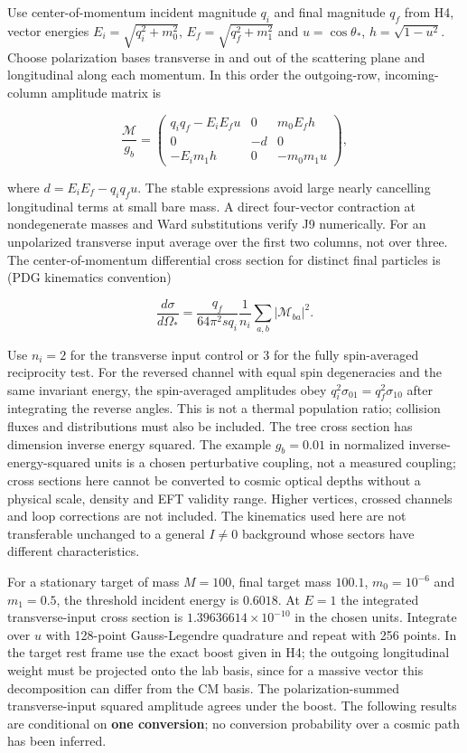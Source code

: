 \documentclass[
  11pt,
  twoside]{article}
\begin{document}
Use center-of-momentum incident magnitude \(q_i\) and final magnitude
\(q_f\) from H4, vector energies \(E_i=\sqrt{q_i^2+m_0^2}\),
\(E_f=\sqrt{q_f^2+m_1^2}\) and \(u=\cos\theta_*\), \(h=\sqrt{1-u^2}\).
Choose polarization bases transverse in and out of the scattering plane
and longitudinal along each momentum. In this order the outgoing-row,
incoming-column amplitude matrix is

\[\frac{\mathcal M}{g_b}=\begin{pmatrix}
q_iq_f-E_iE_fu&0&m_0 E_f h\\
0&-d&0\\
-E_i m_1 h&0&-m_0 m_1 u
\end{pmatrix},\tag{J9}\]

where \(d=E_iE_f-q_iq_fu\). The stable expressions avoid large nearly
cancelling longitudinal terms at small bare mass. A direct four-vector
contraction at nondegenerate masses and Ward substitutions verify J9
numerically. For an unpolarized transverse input average over the first
two columns, not over three. The center-of-momentum differential cross
section for distinct final particles is (PDG kinematics convention)

\[\frac{d\sigma}{d\Omega_*}=\frac{q_f}{64\pi^2 s q_i}
\frac1{n_i}\sum_{a,b}|\mathcal M_{ba}|^2.\tag{J10}\]

Use \(n_i=2\) for the transverse input control or 3 for the fully
spin-averaged reciprocity test. For the reversed channel with equal spin
degeneracies and the same invariant energy, the spin-averaged amplitudes
obey \(q_i^2\sigma_{01}=q_f^2\sigma_{10}\) after integrating the reverse
angles. This is not a thermal population ratio; collision fluxes and
distributions must also be included. The tree cross section has
dimension inverse energy squared. The example \(g_b=0.01\) in normalized
inverse-energy-squared units is a chosen perturbative coupling, not a
measured coupling; cross sections here cannot be converted to cosmic
optical depths without a physical scale, density and EFT validity range.
Higher vertices, crossed channels and loop corrections are not included.
The kinematics used here are not transferable unchanged to a general
\(I\neq0\) background whose sectors have different characteristics.

For a stationary target of mass \(M=100\), final target mass \(100.1\),
\(m_0=10^{-6}\) and \(m_1=0.5\), the threshold incident energy is
\(0.6018\). At \(E=1\) the integrated transverse-input cross section is
\(1.39636614\times10^{-10}\) in the chosen units. Integrate over \(u\)
with 128-point Gauss-Legendre quadrature and repeat with 256 points. In
the target rest frame use the exact boost given in H4; the outgoing
longitudinal weight must be projected onto the lab basis, since for a
massive vector this decomposition can differ from the CM basis. The
polarization-summed transverse-input squared amplitude agrees under the
boost. The following results are conditional on \textbf{one conversion};
no conversion probability over a cosmic path has been inferred.
\end{document}
